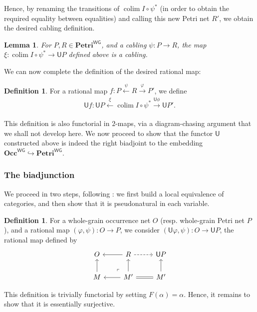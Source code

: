 \documentclass[11pt,a4paper]{article}
\theoremstyle{plain}
\newtheorem{lemma}[theorem]{Lemma}
\theoremstyle{definition}
\newtheorem{definition}[theorem]{Definition}
\theoremstyle{remark}
\newcommand{\WGPetri}{\mathbf{Petri}^{\mathsf{WG}}}
\newcommand{\WGOcc}{\mathbf{Occ}^{\mathsf{WG}}}
\newcommand{\U}{\mathsf{U}}
\newcommand{\Colim}{\colim}
\DeclareMathOperator*{\colim}{colim}
\begin{document}
Hence, by renaming the transitions of $\Colim I \circ \psi^*$ (in order to obtain the required equality between equalities) and calling this new Petri net $R'$, we obtain the desired cabling definition.
\begin{lemma}
    For $P, R \in \WGPetri$, and a cabling $\psi : P \rightarrow R$, the map $\xi : \Colim I \circ \psi^* \rightarrow \U P$ defined above is a cabling.
\end{lemma}
We can now complete the definition of the desired rational map:
\begin{definition}
    For a rational map $f : P \xleftarrow[]{\psi} R \xrightarrow[]{\varphi} P'$, we define
    \[
    \U f : \U P \xleftarrow[]{\xi} \Colim I \circ \psi^* \xrightarrow[]{\U \phi} \U P'.
    \]
\end{definition}
This definition is also functorial in $2$-maps, via a diagram-chasing argument that we shall not develop here. We now proceed to show that the functor $\U$ constructed above is indeed the right biadjoint to the embedding $\WGOcc \hookrightarrow \WGPetri$.
\color{teal}
\subsubsection{The biadjunction}
We proceed in two steps, following \cite{TDC, BCECT}: we first build a local equivalence of categories, and then show that it is pseudonatural in each variable.
\begin{definition}
    For a whole-grain occurrence net $O$ (resp. whole-grain Petri net $P$), and a rational map $(\varphi, \psi) : O \rightarrow P$, we consider $(\U \varphi, \psi) : O \rightarrow \U P$, the rational map defined by
    \[\begin{tikzcd}
	O & R & {\U P} \\
	M & {M'} & {M'}
	\arrow[from=1-2, to=1-1]
	\arrow[dashed, from=1-2, to=1-3]
	\arrow[from=2-1, to=1-1]
	\arrow["\lrcorner"{anchor=center, pos=0.125, rotate=180}, draw=none, from=2-2, to=1-1]
	\arrow[from=2-2, to=1-2]
	\arrow[from=2-2, to=2-1]
	\arrow[from=2-3, to=1-3]
	\arrow[equals, from=2-3, to=2-2]
\end{tikzcd}\]
\end{definition}

This definition is trivially functorial by setting $F(\alpha) = \alpha$. Hence, it remains to show that it is essentially surjective.
\end{document}
